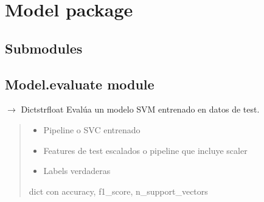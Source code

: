 \documentclass[letterpaper,10pt,english]{sphinxmanual}
\begin{document}
\chapter{Model package}
\label{\detokenize{Model:model-package}}\label{\detokenize{Model::doc}}

\section{Submodules}
\label{\detokenize{Model:submodules}}

\section{Model.evaluate module}
\label{\detokenize{Model:module-Model.evaluate}}\label{\detokenize{Model:model-evaluate-module}}

\begin{fulllineitems}
\label{\detokenize{Model:Model.evaluate.evaluate_model}}
\pysigstartsignatures
\pysiglinewithargsret
{}
{\sphinxparamcomma {}\sphinxparamcomma {}}
{{ $\rightarrow$ Dict\DUrole{p}{{[}}strfloat\DUrole{p}{{]}}}}
\pysigstopsignatures
\sphinxAtStartPar
Evalúa un modelo SVM entrenado en datos de test.
\begin{quote}\begin{description}
\begin{itemize}
\item {} 
\sphinxAtStartPar
{} \sphinxhyphen{}\sphinxhyphen{} Pipeline o SVC entrenado

\item {} 
\sphinxAtStartPar
{} \sphinxhyphen{}\sphinxhyphen{} Features de test escalados o pipeline que incluye scaler

\item {} 
\sphinxAtStartPar
{} \sphinxhyphen{}\sphinxhyphen{} Labels verdaderas

\end{itemize}

\sphinxAtStartPar
dict con \textquotesingle{}accuracy\textquotesingle{}, \textquotesingle{}f1\_score\textquotesingle{}, \textquotesingle{}n\_support\_vectors\textquotesingle{}

\end{description}\end{quote}

\end{fulllineitems}
\end{document}
